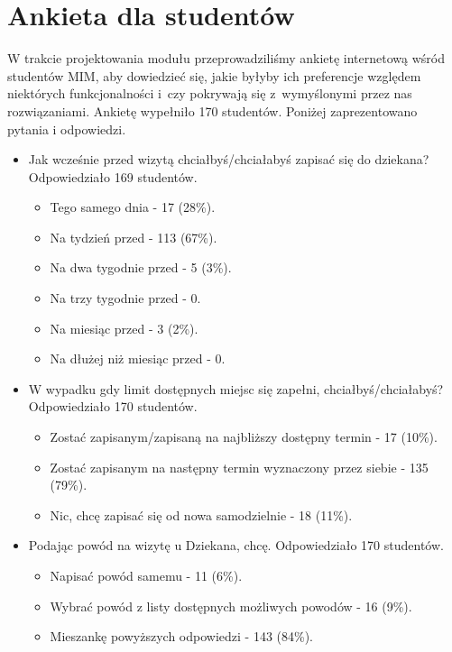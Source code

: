 \documentclass[licencjacka]{pracamgr}
\begin{document}
\section{Ankieta dla studentów} \label{sec:ankieta}
W trakcie projektowania modułu przeprowadziliśmy ankietę internetową wśród studentów MIM, aby dowiedzieć się, jakie byłyby ich preferencje względem niektórych funkcjonalności i~czy pokrywają się z~wymyślonymi przez nas rozwiązaniami. Ankietę wypełniło 170 studentów. Poniżej zaprezentowano pytania i odpowiedzi.
\begin{itemize}
\setlength\itemsep{0,1em}
\item Jak wcześnie przed wizytą chciałbyś/chciałabyś zapisać się do dziekana?
Odpowiedziało 169 studentów.
\begin{itemize}
\setlength\itemsep{0,1em}
\item Tego samego dnia - 17 (28\%).
\item Na tydzień przed - 113 (67\%).
\item Na dwa tygodnie przed - 5 (3\%).
\item Na trzy tygodnie przed - 0.
\item Na miesiąc przed - 3 (2\%).
\item Na dłużej niż miesiąc przed - 0.
\end{itemize}

\item W wypadku gdy limit dostępnych miejsc się zapełni, chciałbyś/chciałabyś?
Odpowiedziało 170 studentów.
\begin{itemize}
\setlength\itemsep{0,1em}
\item Zostać zapisanym/zapisaną na najbliższy dostępny termin - 17 (10\%).
\item Zostać zapisanym na następny termin wyznaczony przez siebie - 135 (79\%).
\item Nic, chcę zapisać się od nowa samodzielnie - 18 (11\%).
\end{itemize}

\item Podając powód na wizytę u Dziekana, chcę.
Odpowiedziało 170 studentów.
\begin{itemize}
\setlength\itemsep{0,1em}

\item Napisać powód samemu - 11 (6\%).
\item Wybrać powód z listy dostępnych możliwych powodów - 16 (9\%).
\item Mieszankę powyższych odpowiedzi - 143 (84\%).
\end{itemize}


\end{itemize}
\end{document}
